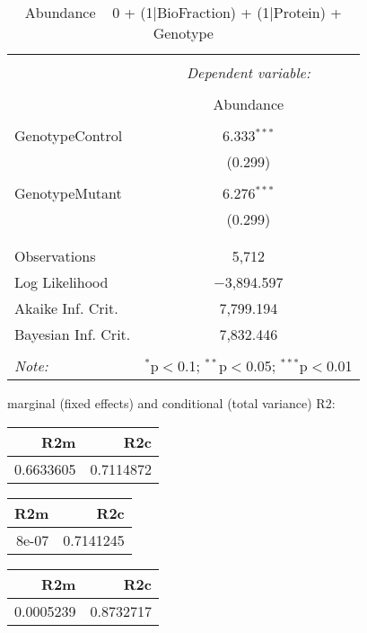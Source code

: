 \documentclass[11pt]{report}
\begin{document}
\begin{table}[!htbp] \centering 
  \caption{Abundance ~ 0 + (1|BioFraction) + (1|Protein) + Genotype} 
  \label{} 
\begin{tabular}{@{\extracolsep{5pt}}lc} 
\\[-1.8ex]\hline 
\hline \\[-1.8ex] 
 & \multicolumn{1}{c}{\textit{Dependent variable:}} \\ 
\cline{2-2} 
\\[-1.8ex] & Abundance \\ 
\hline \\[-1.8ex] 
 GenotypeControl & 6.333$^{***}$ \\ 
  & (0.299) \\ 
  & \\ 
 GenotypeMutant & 6.276$^{***}$ \\ 
  & (0.299) \\ 
  & \\ 
\hline \\[-1.8ex] 
Observations & 5,712 \\ 
Log Likelihood & $-$3,894.597 \\ 
Akaike Inf. Crit. & 7,799.194 \\ 
Bayesian Inf. Crit. & 7,832.446 \\ 
\hline 
\hline \\[-1.8ex] 
\textit{Note:}  & \multicolumn{1}{r}{$^{*}$p$<$0.1; $^{**}$p$<$0.05; $^{***}$p$<$0.01} \\ 
\end{tabular} 
\end{table} 
marginal (fixed effects) and conditional (total variance) R2:

\begin{tabular}{r|r}
\hline
R2m & R2c\\
\hline
0.6633605 & 0.7114872\\
\hline
\end{tabular}

\begin{tabular}{r|r}
\hline
R2m & R2c\\
\hline
8e-07 & 0.7141245\\
\hline
\end{tabular}

\begin{tabular}{r|r}
\hline
R2m & R2c\\
\hline
0.0005239 & 0.8732717\\
\hline
\end{tabular}
\end{document}

